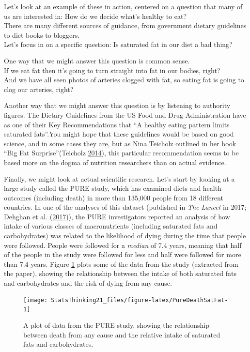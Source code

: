 \documentclass[12pt,]{book}
\theoremstyle{definition}
\theoremstyle{definition}
\theoremstyle{definition}
\theoremstyle{remark}
\begin{document}
Let's look at an example of these in action, centered on a question that many of us are interested in: How do we decide what's healthy to eat?\\
There are many different sources of guidance, from government dietary guidelines to diet books to bloggers.\\
Let's focus in on a specific question: Is saturated fat in our diet a bad thing?

One way that we might answer this question is common sense.\\
If we eat fat then it's going to turn straight into fat in our bodies, right?\\
And we have all seen photos of arteries clogged with fat, so eating fat is going to clog our arteries, right?

Another way that we might answer this question is by listening to authority figures. The Dietary Guidelines from the US Food and Drug Administration have as one of their Key Recommendations that ``A healthy eating pattern limits saturated fats''.You might hope that these guidelines would be based on good science, and in some cases they are, but as Nina Teicholz outlined in her book ``Big Fat Surprise''(Teicholz \protect\hyperlink{ref-teic:2014}{2014}), this particular recommendation seems to be based more on the dogma of nutrition researchers than on actual evidence.

Finally, we might look at actual scientific research. Let's start by looking at a large study called the PURE study, which has examined diets and health outcomes (including death) in more than 135,000 people from 18 different countries. In one of the analyses of this dataset (published in \emph{The Lancet} in 2017; Dehghan et al. (\protect\hyperlink{ref-dehg:ment:zhan:2017}{2017})), the PURE investigators reported an analysis of how intake of various classes of macronutrients (including saturated fats and carbohydrates) was related to the likelihood of dying during the time that people were followed. People were followed for a \emph{median} of 7.4 years, meaning that half of the people in the study were followed for less and half were followed for more than 7.4 years. Figure \ref{fig:PureDeathSatFat} plots some of the data from the study (extracted from the paper), showing the relationship between the intake of both saturated fats and carbohydrates and the risk of dying from any cause.

\begin{figure}
\texttt{[image: StatsThinking21\_files/figure-latex/PureDeathSatFat-1]} \caption{A plot of data from the PURE study, showing the relationship between death from any cause and the relative intake of saturated fats and carbohydrates.}\label{fig:PureDeathSatFat}
\end{figure}
\end{document}
